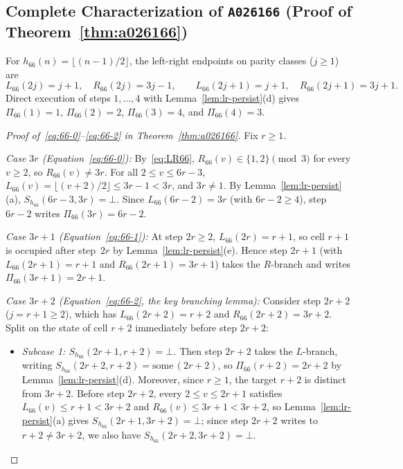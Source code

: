 \documentclass[11pt]{article}
\theoremstyle{definition}
\newcommand{\seq}[1]{\texttt{#1}}
\begin{document}
\subsection{Complete Characterization of \seq{A026166} (Proof of Theorem~\ref{thm:a026166})}

For $h_{66}(n) = \lfloor (n-1)/2 \rfloor$, the left-right endpoints on parity classes ($j \ge 1$) are
\begin{equation}
\label{eq:LR66}
L_{66}(2j) = j + 1,\quad R_{66}(2j) = 3j - 1, \qquad
L_{66}(2j + 1) = j + 1,\quad R_{66}(2j + 1) = 3j + 1.
\end{equation}
Direct execution of steps $1, \dots, 4$ with Lemma~\ref{lem:lr-persist}(d) gives $\Pi_{66}(1) = 1$, $\Pi_{66}(2) = 2$, $\Pi_{66}(3) = 4$, and $\Pi_{66}(4) = 3$.

\begin{proof}[Proof of~\eqref{eq:66-0}--\eqref{eq:66-2} in Theorem~\ref{thm:a026166}]
Fix $r \ge 1$.

\emph{Case $3r$ (Equation~\eqref{eq:66-0}):} By~\eqref{eq:LR66}, $R_{66}(v) \in \{1, 2\} \pmod{3}$ for every $v \ge 2$, so $R_{66}(v) \ne 3r$. For all $2 \le v \le 6r - 3$, $L_{66}(v) = \lfloor (v + 2)/2 \rfloor \le 3r - 1 < 3r$, and $3r \ne 1$. By Lemma~\ref{lem:lr-persist}(a), $S_{h_{66}}(6r - 3, 3r) = \bot$. Since $L_{66}(6r - 2) = 3r$ (with $6r - 2 \ge 4$), step $6r - 2$ writes $\Pi_{66}(3r) = 6r - 2$.

\emph{Case $3r + 1$ (Equation~\eqref{eq:66-1}):} At step $2r \ge 2$, $L_{66}(2r) = r + 1$, so cell $r + 1$ is occupied after step~$2r$ by Lemma~\ref{lem:lr-persist}(e). Hence step $2r + 1$ (with $L_{66}(2r+1) = r + 1$ and $R_{66}(2r+1) = 3r + 1$) takes the $R$-branch and writes $\Pi_{66}(3r + 1) = 2r + 1$.

\emph{Case $3r + 2$ (Equation~\eqref{eq:66-2}, the key branching lemma):} Consider step $2r + 2$ ($j = r + 1 \ge 2$), which has $L_{66}(2r + 2) = r + 2$ and $R_{66}(2r + 2) = 3r + 2$. Split on the state of cell $r + 2$ immediately before step $2r + 2$:
\begin{itemize}
\item \emph{Subcase 1: $S_{h_{66}}(2r + 1, r + 2) = \bot$.} Then step $2r + 2$ takes the $L$-branch, writing $S_{h_{66}}(2r + 2, r + 2) = \mathrm{some}\,(2r + 2)$, so $\Pi_{66}(r + 2) = 2r + 2$ by Lemma~\ref{lem:lr-persist}(d). Moreover, since $r \ge 1$, the target $r + 2$ is distinct from $3r + 2$. Before step $2r + 2$, every $2 \le v \le 2r + 1$ satisfies $L_{66}(v) \le r + 1 < 3r + 2$ and $R_{66}(v) \le 3r + 1 < 3r + 2$, so Lemma~\ref{lem:lr-persist}(a) gives $S_{h_{66}}(2r + 1, 3r + 2) = \bot$; since step $2r + 2$ writes to $r + 2 \ne 3r + 2$, we also have $S_{h_{66}}(2r + 2, 3r + 2) = \bot$.


\end{itemize}
\end{proof}
\end{document}
